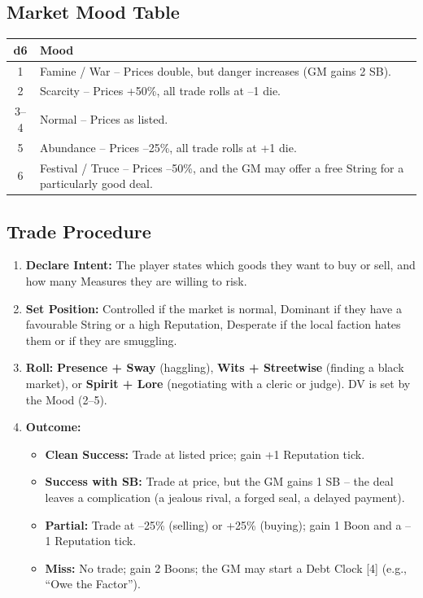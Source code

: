 \documentclass[11pt]{book}
\begin{document}
\subsection*{Market Mood Table}
\begin{center}
\begin{tabular}{|c|l|}
\hline
\textbf{d6} & \textbf{Mood} \\
\hline
1 & Famine / War – Prices double, but danger increases (GM gains 2 SB). \\
2 & Scarcity – Prices +50\%, all trade rolls at –1 die. \\
3–4 & Normal – Prices as listed. \\
5 & Abundance – Prices –25\%, all trade rolls at +1 die. \\
6 & Festival / Truce – Prices –50\%, and the GM may offer a free String for a particularly good deal. \\
\hline
\end{tabular}
\end{center}

\subsection*{Trade Procedure}
\begin{enumerate}
    \item \textbf{Declare Intent:} The player states which goods they want to buy or sell, and how many Measures they are willing to risk.
    \item \textbf{Set Position:} Controlled if the market is normal, Dominant if they have a favourable String or a high Reputation, Desperate if the local faction hates them or if they are smuggling.
    \item \textbf{Roll:} \textbf{Presence + Sway} (haggling), \textbf{Wits + Streetwise} (finding a black market), or \textbf{Spirit + Lore} (negotiating with a cleric or judge). DV is set by the Mood (2–5).
    \item \textbf{Outcome:}
    \begin{itemize}
        \item \textbf{Clean Success:} Trade at listed price; gain +1 Reputation tick.
        \item \textbf{Success with SB:} Trade at price, but the GM gains 1 SB – the deal leaves a complication (a jealous rival, a forged seal, a delayed payment).
        \item \textbf{Partial:} Trade at –25\% (selling) or +25\% (buying); gain 1 Boon and a –1 Reputation tick.
        \item \textbf{Miss:} No trade; gain 2 Boons; the GM may start a Debt Clock [4] (e.g., “Owe the Factor”).
    \end{itemize}
\end{enumerate}
\end{document}
